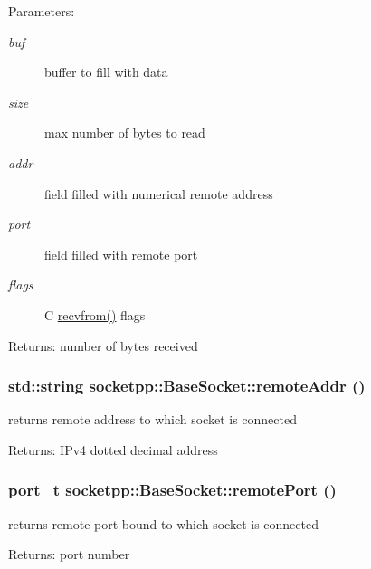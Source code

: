 \begin{CompactItemize}
\begin{Desc}
\item[Parameters:]
\begin{description}
\item[{\em buf}]buffer to fill with data \item[{\em size}]max number of bytes to read \item[{\em addr}]field filled with numerical remote address \item[{\em port}]field filled with remote port \item[{\em flags}]C \hyperlink{classsocketpp_1_1BaseSocket_6a207860c0a1328dc05bea32bb62e81f}{recvfrom()} flags \end{description}
\end{Desc}
\begin{Desc}
\item[Returns:]number of bytes received \end{Desc}
\hypertarget{classsocketpp_1_1BaseSocket_483c6186ae60d0c399983e14f55af600}{
\subsubsection[{remoteAddr}]{\setlength{\rightskip}{0pt plus 5cm}std::string socketpp::BaseSocket::remoteAddr ()}}
\label{classsocketpp_1_1BaseSocket_483c6186ae60d0c399983e14f55af600}


returns remote address to which socket is connected 

\begin{Desc}
\item[Returns:]IPv4 dotted decimal address \end{Desc}
\hypertarget{classsocketpp_1_1BaseSocket_039db642444d2111f2f58ebe032c5f5f}{
\subsubsection[{remotePort}]{\setlength{\rightskip}{0pt plus 5cm}port\_\-t socketpp::BaseSocket::remotePort ()}}
\label{classsocketpp_1_1BaseSocket_039db642444d2111f2f58ebe032c5f5f}


returns remote port bound to which socket is connected 

\begin{Desc}
\item[Returns:]port number \end{Desc}
\hypertarget{classsocketpp_1_1BaseSocket_8a5fa7a9374964d7978285a003301b9d}{
}
\end{CompactItemize}

